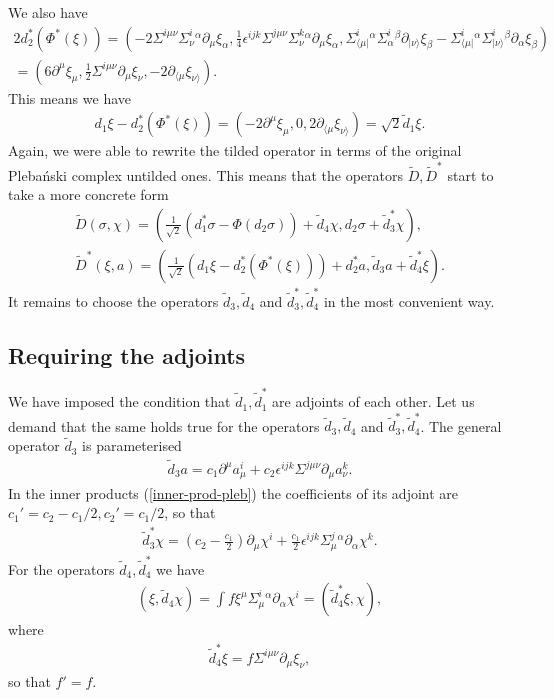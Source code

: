 \documentclass[10pt]{report}
\newcommand{\pleb}[0]{Pleba\'nski}
\theoremstyle{definition}
\begin{document}
We also have
\begin{align}
2 d_2^*( \Phi^*(\xi)) = (-2\Sigma^{i\mu\nu}  \Sigma^i_\nu{}^\alpha \partial_\mu \xi_\alpha, \frac{1}{4} \epsilon^{ijk} \Sigma^{j\mu\nu}  \Sigma^k_\nu{}^\alpha \partial_\mu \xi_\alpha, \Sigma^i_{\langle\mu|}{}^\alpha \Sigma^i_\alpha{}^\beta \partial_{|\nu\rangle} \xi_\beta-\Sigma^i_{\langle\mu|}{}^\alpha \Sigma^i_{|\nu\rangle}{}^\beta \partial_\alpha  \xi_\beta ) \\ \nonumber = 
 (  6 \partial^\mu \xi_\mu, \frac{1}{2} \Sigma^{i\mu\nu} \partial_\mu  \xi_\nu, -2 \partial_{\langle\mu}\xi_{\nu\rangle} ).
\end{align}
This means we have
\begin{align}
d_1\xi - d_2^*( \Phi^*(\xi)) = (-2 \partial^\mu \xi_\mu , 0, 2 \partial_{\langle\mu}\xi_{\nu\rangle} ) = \sqrt{2} \tilde{d}_1 \xi.
\end{align}
Again, we were able to rewrite the tilded operator in terms of the original \pleb{} complex untilded ones. This means that the operators $\tilde{D},\tilde{D}^*$ start to take a more concrete form
\begin{align}
\tilde{D}(\sigma,\chi) = (\frac{1}{\sqrt{2}}(d_1^*\sigma - \Phi(d_2\sigma)) + \tilde{d}_4 \chi, d_2\sigma + \tilde{d}_3^* \chi), \\ \nonumber
\tilde{D}^*(\xi,a) = ( \frac{1}{\sqrt{2}} (d_1 \xi -  d_2^* (\Phi^*(\xi))) + d_2^* a, \tilde{d}_3 a + \tilde{d}_4^* \xi).
\end{align}
It remains to choose the operators $\tilde{d}_3, \tilde{d}_4$ and $\tilde{d}_3^*, \tilde{d}_4^*$ in the most convenient way.

\subsection{Requiring the adjoints}

We have imposed the condition that $\tilde{d}_1, \tilde{d}_1^*$ are adjoints of each other. Let us demand that the same holds true for the operators $\tilde{d}_3, \tilde{d}_4$ and $\tilde{d}_3^*, \tilde{d}_4^*$. The general operator $\tilde{d}_3$ is parameterised
\begin{align}
\tilde{d}_3 a = c_1 \partial^\mu a_\mu^i + c_2 \epsilon^{ijk} \Sigma^{j\mu\nu} \partial_\mu a_\nu^k.
\end{align}
In the inner products (\ref{inner-prod-pleb}) the coefficients of its adjoint are $c_1'=c_2 - c_1/2, c_2'   = c_1/2$, so that 
\begin{align}
\tilde{d}_3^* \chi = ( c_2 - \frac{c_1}{2}) \partial_\mu \chi^i + \frac{c_1}{2} \epsilon^{ijk} \Sigma^j_\mu{}^\alpha \partial_\alpha \chi^k.
\end{align}
For the operators $\tilde{d}_4, \tilde{d}_4^*$ we have
\begin{align}
(\xi, \tilde{d}_4 \chi) = \int f \xi^\mu \Sigma^i_\mu{}^\alpha \partial_\alpha \chi^i = (\tilde{d}_4^* \xi, \chi),
\end{align}
where 
\begin{align}
\tilde{d}_4^* \xi = f \Sigma^{i\mu\nu} \partial_\mu \xi_\nu,
\end{align}
so that $f'=f$. 
\end{document}
